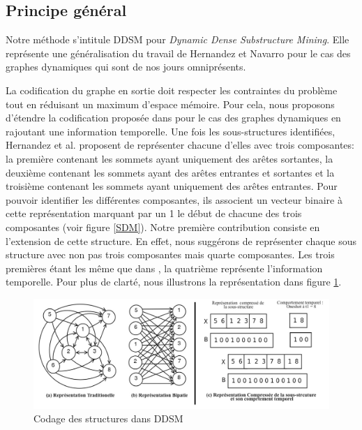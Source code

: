 		\subsection{Principe général}
			Notre méthode s'intitule DDSM pour \textit{Dynamic Dense Substructure Mining}. Elle représente une généralisation du travail de Hernandez et Navarro \citep{hernandez2014compressed} pour le cas des graphes dynamiques qui sont de nos jours omniprésents.
			
			
			La codification du graphe en sortie doit respecter les contraintes du problème tout en réduisant un maximum d'espace mémoire. Pour cela, nous proposons d'étendre la codification proposée dans \citep{hernandez2014compressed} pour le cas des graphes dynamiques en rajoutant une information temporelle. Une fois les sous-structures identifiées, Hernandez et al. \citep{hernandez2014compressed} proposent de représenter chacune d'elles avec trois composantes: la première contenant les sommets ayant uniquement des arêtes sortantes, la deuxième contenant les sommets ayant des arêtes entrantes et sortantes et la troisième contenant les sommets ayant uniquement des arêtes entrantes. Pour pouvoir identifier les différentes composantes, ils associent un vecteur binaire à cette représentation marquant par un 1 le début de chacune des trois composantes (voir figure \ref{SDM}). Notre première contribution consiste en l'extension de cette structure. En effet, nous suggérons de représenter chaque sous structure avec non pas trois composantes mais quarte composantes. Les trois premières étant les même que dans \citep{hernandez2014compressed}, la quatrième représente l'information temporelle. Pour plus de clarté, nous illustrons la représentation dans figure \ref{ddsmCode}.
	
		\begin{figure}[H]
\centering
	\includegraphics[scale=0.45]{./ressources/image/dsmRepresentation.jpg}
	\caption[Codage des structures dans DDSM]{Codage des structures dans DDSM}
	\label{ddsmCode}
\end{figure}			
			
